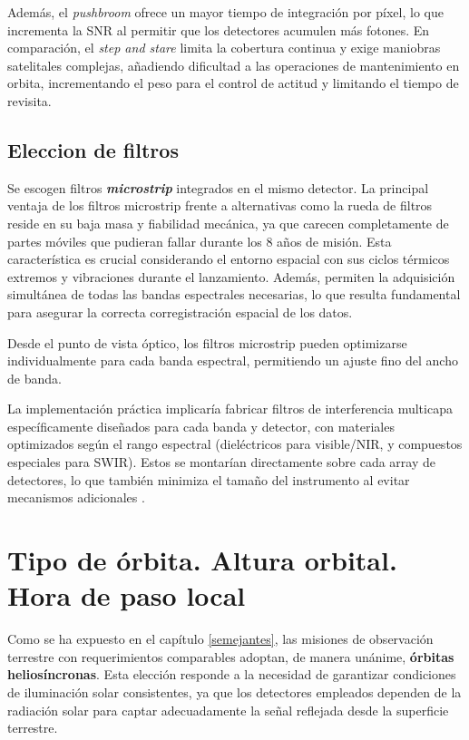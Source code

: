 Además, el \textit{pushbroom} ofrece un mayor tiempo de integración por píxel, lo que incrementa la SNR al permitir que los detectores acumulen más fotones. En comparación, el \textit{step and stare} limita la cobertura continua y exige maniobras satelitales complejas, añadiendo dificultad a las operaciones de mantenimiento en orbita, incrementando el peso para el control de actitud y limitando el tiempo de revisita.

\subsection{Eleccion de filtros}

Se escogen filtros \textit{\textbf{microstrip}} integrados en el mismo detector. La principal ventaja de los filtros microstrip frente a alternativas como la rueda de filtros reside en su baja masa y fiabilidad mecánica, ya que carecen completamente de partes móviles que pudieran fallar durante los 8 años de misión. Esta característica es crucial considerando el entorno espacial con sus ciclos térmicos extremos y vibraciones durante el lanzamiento. Además, permiten la adquisición simultánea de todas las bandas espectrales necesarias, lo que resulta fundamental para asegurar la correcta corregistración espacial de los datos.


Desde el punto de vista óptico, los filtros microstrip pueden optimizarse individualmente para cada banda espectral, permitiendo un ajuste fino del ancho de banda.


La implementación práctica implicaría fabricar filtros de interferencia multicapa específicamente diseñados para cada banda y detector, con materiales optimizados según el rango espectral (dieléctricos para visible/NIR, y compuestos especiales para SWIR). Estos se montarían directamente sobre cada array de detectores, lo que también minimiza el tamaño del instrumento al evitar mecanismos adicionales \cite{macleod2010}.

\section{Tipo de órbita. Altura orbital. Hora de paso local}

Como se ha expuesto en el capítulo \ref{semejantes}, las misiones de observación terrestre con requerimientos comparables adoptan, de manera unánime, \textbf{órbitas heliosíncronas}. Esta elección responde a la necesidad de garantizar condiciones de iluminación solar consistentes, ya que los detectores empleados dependen de la radiación solar para captar adecuadamente la señal reflejada desde la superficie terrestre.


